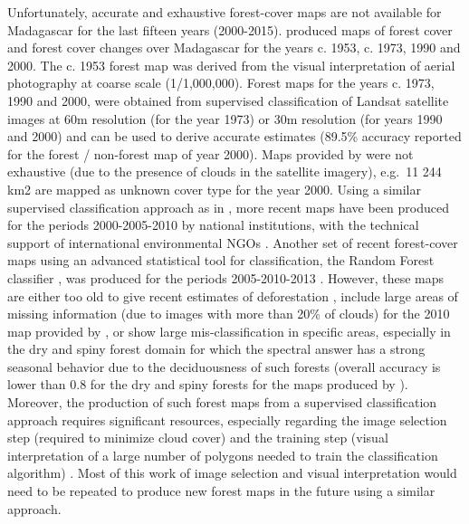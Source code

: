 \documentclass[a4paper, 12pt, leqno]{article} %
\begin{document}
Unfortunately, accurate and exhaustive forest-cover maps are not
available for Madagascar for the last fifteen years (2000-2015).
\citet{Harper2007} produced maps of forest cover and forest cover
changes over Madagascar for the years c. 1953, c. 1973, 1990 and 2000.
The c. 1953 forest map was derived from the visual interpretation of
aerial photography at coarse scale (1/1,000,000). Forest maps for the
years c. 1973, 1990 and 2000, were obtained from supervised
classification of Landsat satellite images at 60m resolution (for the
year 1973) or 30m resolution (for years 1990 and 2000) and can be used
to derive accurate estimates (89.5\% accuracy reported for the forest
/ non-forest map of year 2000). Maps provided by \citet{Harper2007}
were not exhaustive (due to the presence of clouds in the satellite
imagery), e.g.~11 244 km2 are mapped as unknown cover type for the
year 2000.  Using a similar supervised classification approach as in
\citet{Harper2007}, more recent maps have been produced for the
periods 2000-2005-2010 by national institutions, with the technical
support of international environmental NGOs \citep{MEFT2009,
  ONE2013}. Another set of recent forest-cover maps using an advanced
statistical tool for classification, the Random Forest classifier
\citep{Grinand2013, Rakotomalala2015}, was produced for the periods
2005-2010-2013 \citep{ONE2015}. However, these maps are either too old
to give recent estimates of deforestation \citep{MEFT2009, ONE2013},
include large areas of missing information (due to images with more
than 20\% of clouds) for the 2010 map provided by \citep{ONE2013}, or
show large mis-classification in specific areas, especially in the dry
and spiny forest domain for which the spectral answer has a strong
seasonal behavior due to the deciduousness of such forests (overall
accuracy is lower than 0.8 for the dry and spiny forests for the maps
produced by \citet{ONE2015}). Moreover, the production of such forest
maps from a supervised classification approach requires significant
resources, especially regarding the image selection step (required to
minimize cloud cover) and the training step (visual interpretation of
a large number of polygons needed to train the classification
algorithm) \citep{Rakotomalala2015}. Most of this work of image
selection and visual interpretation would need to be repeated to
produce new forest maps in the future using a similar approach.
\end{document}
